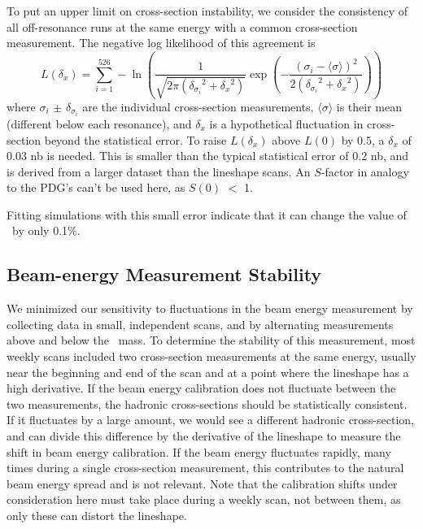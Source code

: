 \documentclass[aps,prd,preprint,superscriptaddress,tightenlines,nofootinbib,floatfix]{revtex4}
\begin{document}
To put an upper limit on cross-section instability, we consider the
consistency of all off-resonance runs at the same energy with a
common cross-section measurement.  The negative log likelihood of
this agreement is
\begin{equation}
  L(\delta_x) = \sum_{i=1}^{526} -\ln \left(\frac{1}{\sqrt{2\pi
  ({\delta_{\sigma_i}}^2 + {\delta_x}^2)}} \exp\left(-\frac{(\sigma_i
  - \langle\sigma\rangle)^2}{2 ({\delta_{\sigma_i}}^2 + {\delta_x}^2)}
  \right)\right)
\end{equation}
where $\sigma_i$ $\pm$ $\delta_{\sigma_i}$ are the individual
cross-section measurements, $\langle\sigma\rangle$ is their mean
(different below each resonance), and $\delta_x$ is a hypothetical
fluctuation in cross-section beyond the statistical error.  To raise
$L(\delta_x)$ above $L(0)$ by 0.5, a $\delta_x$ of 0.03 nb is needed.
This is smaller than the typical statistical error of 0.2 nb, and is
derived from a larger dataset than the lineshape scans.  An $S$-factor
in analogy to the PDG's can't be used here, as $S(0)$ $<$ 1.

Fitting simulations with this small error indicate that it can change
the value of \gee\ by only 0.1\%.

%
\subsection{Beam-energy Measurement Stability} \label{sec:energy}
%

We minimized our sensitivity to fluctuations in the beam energy
measurement by collecting data in small, independent scans, and by
alternating measurements above and below the \ups\ mass.  To determine
the stability of this measurement, most weekly scans included two
cross-section measurements at the same energy, usually near the
beginning and end of the scan and at a point where the lineshape has a
high derivative.  If the beam energy calibration does not fluctuate
between the two measurements, the hadronic cross-sections should be
statistically consistent.  If it fluctuates by a large amount, we
would see a different hadronic cross-section, and can divide this
difference by the derivative of the lineshape to measure the shift in
beam energy calibration.  If the beam energy fluctuates rapidly, many
times during a single cross-section measurement, this contributes to
the natural beam energy spread and is not relevant.  Note that the
calibration shifts under consideration here must take place during a
weekly scan, not between them, as only these can distort the
lineshape.
\end{document}
